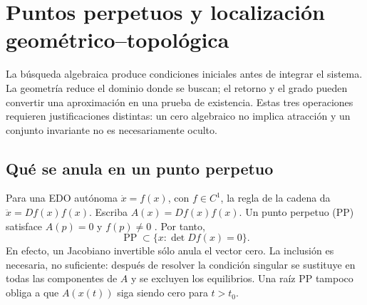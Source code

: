 \section{Puntos perpetuos y localización geométrico--topológica}
\label{bre:geo:section}

La búsqueda algebraica produce condiciones iniciales antes de integrar el
sistema. La geometría reduce el dominio donde se buscan; el retorno y el
grado pueden convertir una aproximación en una prueba de existencia. Estas
tres operaciones requieren justificaciones distintas: un cero algebraico
no implica atracción y un conjunto invariante no es necesariamente oculto.

\subsection{Qué se anula en un punto perpetuo}

Para una EDO autónoma $\dot x=f(x)$, con $f\in C^1$, la regla de la cadena
da $\ddot x=Df(x)f(x)$. Escriba $A(x)=Df(x)f(x)$.
Un punto perpetuo (PP) satisface $A(p)=0$ y $f(p)\ne0$
\cite{Prasad2015Perpetual,DudkowskiPrasadKapitaniak2017}. Por tanto,
\begin{equation}
 \operatorname{PP}\subset\{x:\det Df(x)=0\}.
 \label{bre:geo:singular}
\end{equation}
En efecto, un Jacobiano invertible sólo anula el vector cero. La inclusión
es necesaria, no suficiente: después de resolver la condición singular se
sustituye en todas las componentes de $A$ y se excluyen los equilibrios.
Una raíz PP tampoco obliga a que $A(x(t))$ siga siendo cero para $t>t_0$.

